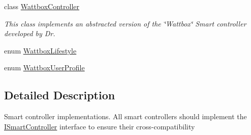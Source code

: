 \begin{DoxyCompactItemize}
class \hyperlink{classuk_1_1ac_1_1dmu_1_1iesd_1_1cascade_1_1controllers_1_1_wattbox_controller}{Wattbox\-Controller}
\begin{DoxyCompactList}\small\item\em This class implements an abstracted version of the \char`\"{}\-Wattbox\char`\"{} Smart controller developed by Dr. \end{DoxyCompactList}\item 
enum \hyperlink{enumuk_1_1ac_1_1dmu_1_1iesd_1_1cascade_1_1controllers_1_1_wattbox_lifestyle}{Wattbox\-Lifestyle}
\item 
enum \hyperlink{enumuk_1_1ac_1_1dmu_1_1iesd_1_1cascade_1_1controllers_1_1_wattbox_user_profile}{Wattbox\-User\-Profile}
\end{DoxyCompactItemize}


\subsection{Detailed Description}
Smart controller implementations. All smart controllers should implement the \hyperlink{interfaceuk_1_1ac_1_1dmu_1_1iesd_1_1cascade_1_1controllers_1_1_i_smart_controller}{I\-Smart\-Controller} interface to ensure their cross-\/compatibility 